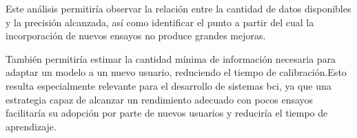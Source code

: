 Este análisis permitiría observar la relación entre la cantidad de datos disponibles y la precisión alcanzada, así como identificar el punto a partir del cual la incorporación de nuevos ensayos no produce grandes mejoras.

También permitiría estimar la cantidad mínima de información necesaria para adaptar un modelo a un nuevo usuario, reduciendo el tiempo de calibración.Esto resulta especialmente relevante para el desarrollo de sistemas \acrshort{bci}, ya que una estrategia capaz de alcanzar un rendimiento adecuado con pocos ensayos facilitaría su adopción por parte de nuevos usuarios y reduciría el tiempo de aprendizaje.